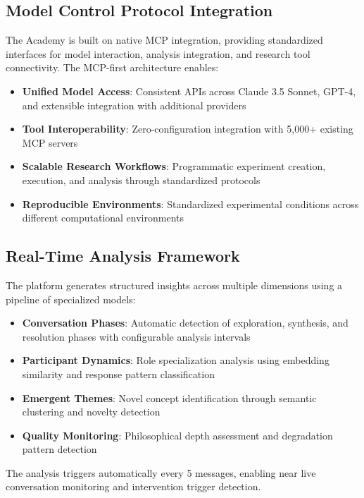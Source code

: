 \documentclass[11pt,letterpaper]{article}
\newcommand{\theacademy}{The Academy}
\newcommand{\mcp}{MCP}
\begin{document}
\subsection{Model Control Protocol Integration}

\theacademy{} is built on native \mcp{} integration, providing standardized interfaces for model interaction, analysis integration, and research tool connectivity. The \mcp{}-first architecture enables:

\begin{itemize}
    \item \textbf{Unified Model Access}: Consistent APIs across Claude 3.5 Sonnet, GPT-4, and extensible integration with additional providers
    \item \textbf{Tool Interoperability}: Zero-configuration integration with 5,000+ existing \mcp{} servers
    \item \textbf{Scalable Research Workflows}: Programmatic experiment creation, execution, and analysis through standardized protocols
    \item \textbf{Reproducible Environments}: Standardized experimental conditions across different computational environments
\end{itemize}

\subsection{Real-Time Analysis Framework}

The platform generates structured insights across multiple dimensions using a pipeline of specialized models:

\begin{itemize}
    \item \textbf{Conversation Phases}: Automatic detection of exploration, synthesis, and resolution phases with configurable analysis intervals
    \item \textbf{Participant Dynamics}: Role specialization analysis using embedding similarity and response pattern classification
    \item \textbf{Emergent Themes}: Novel concept identification through semantic clustering and novelty detection
    \item \textbf{Quality Monitoring}: Philosophical depth assessment and degradation pattern detection
\end{itemize}

The analysis triggers automatically every 5 messages, enabling near live conversation monitoring and intervention trigger detection.
\end{document}

